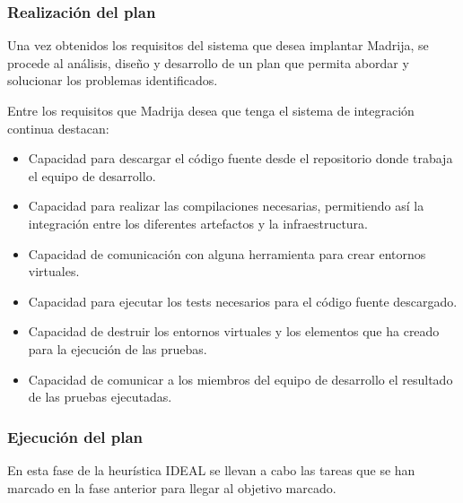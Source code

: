 \subsubsection{Realización del plan}

Una vez obtenidos los requisitos del sistema que desea implantar \ac{Madrija}, se procede al análisis, diseño y desarrollo de un plan que permita abordar y solucionar los problemas identificados.

\clearpage

Entre los requisitos que \ac{Madrija} desea que tenga el sistema de integración continua destacan:
\begin{itemize}
\item Capacidad para descargar el código fuente desde el repositorio donde trabaja el equipo de desarrollo.
\item Capacidad para realizar las compilaciones necesarias, permitiendo así la integración entre los diferentes artefactos y la infraestructura.
\item Capacidad de comunicación con alguna herramienta para crear entornos virtuales.
\item Capacidad para ejecutar los tests necesarios para el código fuente descargado.
\item Capacidad de destruir los entornos virtuales y los elementos que ha creado para la ejecución de las pruebas.
\item Capacidad de comunicar a los miembros del equipo de desarrollo el resultado de las pruebas ejecutadas.
\end{itemize}

\subsubsection{Ejecución del plan}

En esta fase de la heurística IDEAL se llevan a cabo las tareas que se han marcado en la fase anterior para llegar al objetivo marcado.



